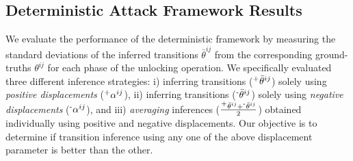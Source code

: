 \documentclass[]{IEEEtran}
\begin{document}
\subsection{Deterministic Attack Framework Results}
\label{eval:controlleddet}
We evaluate the performance of the deterministic framework by measuring the standard deviations of the inferred transitions $\bar{\theta}^{ij}$ from the corresponding ground-truths $\theta^{ij}$ for each phase of the unlocking operation.
We specifically evaluated three different inference strategies: i) inferring transitions ($\textsuperscript{+}\bar{\theta}^{ij}$) solely using \emph{positive displacements} ($\textsuperscript{+}\alpha^{ij}$), ii) inferring transitions ($\textsuperscript{-}\bar{\theta}^{ij}$) solely using \emph{negative displacements} ($\textsuperscript{-}\alpha^{ij}$), and iii) \emph{averaging} inferences ($\frac{\textsuperscript{+}\bar{\theta}^{ij}+\textsuperscript{-}\bar{\theta}^{ij}}{2}$) obtained individually using positive and negative displacements. Our objective is to determine if transition inference using any one of the above displacement parameter is better than the other. 
\end{document}
